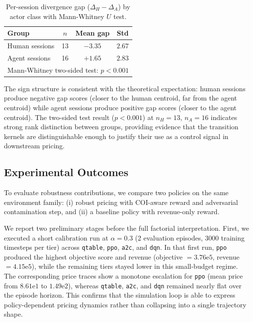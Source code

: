\begin{table}[ht]
\centering
\caption{Per-session divergence gap ($\Delta_H - \Delta_A$) by actor class with Mann-Whitney $U$ test.}
\label{tab:divergence_significance}
\begin{tabular}{lccc}
\toprule
Group & $n$ & Mean gap & Std \\
\midrule
Human sessions & 13 & $-3.35$ & $2.67$ \\
Agent sessions & 16 & $+1.65$ & $2.83$ \\
\midrule
\multicolumn{4}{l}{Mann-Whitney two-sided test: $p<0.001$} \\
\bottomrule
\end{tabular}
\end{table}

The sign structure is consistent with the theoretical expectation: human sessions produce negative gap scores (closer to the human centroid, far from the agent centroid) while agent sessions produce positive gap scores (closer to the agent centroid). The two-sided test result ($p<0.001$) at $n_H=13$, $n_A=16$ indicates strong rank distinction between groups, providing evidence that the transition kernels are distinguishable enough to justify their use as a control signal in downstream pricing.


\subsection{Experimental Outcomes}

To evaluate robustness contributions, we compare two policies on the same environment family: (i) robust pricing with COI-aware reward and adversarial contamination step, and (ii) a baseline policy with revenue-only reward.

We report two preliminary stages before the full factorial interpretation. First, we executed a short calibration run at $\alpha=0.3$ (2 evaluation episodes, 3000 training timesteps per tier) across \texttt{qtable}, \texttt{ppo}, \texttt{a2c}, and \texttt{dqn}. In that first run, \texttt{ppo} produced the highest objective score and revenue (objective $=3.76\mathrm{e}5$, revenue $=4.15\mathrm{e}5$), while the remaining tiers stayed lower in this small-budget regime. The corresponding price traces show a monotone escalation for \texttt{ppo} (mean price from $8.61\mathrm{e}1$ to $1.49\mathrm{e}2$), whereas \texttt{qtable}, \texttt{a2c}, and \texttt{dqn} remained nearly flat over the episode horizon. This confirms that the simulation loop is able to express policy-dependent pricing dynamics rather than collapsing into a single trajectory shape.


